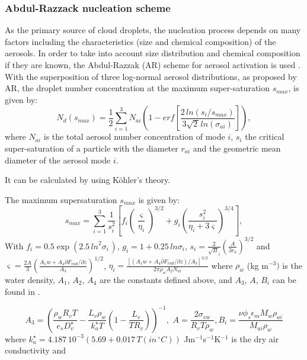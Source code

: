 \subsubsection{Abdul-Razzack nucleation scheme}

As the primary source of cloud droplets, the nucleation process depends on
many factors including the characteristics (size and chemical composition)
of the aerosols. In order to take into account size distribution and
chemical composition if they are known, the Abdul-Razzak (AR) scheme
for aerosol activation is used \cite{Abdul-Razzak:2000}. With the superposition of three
log-normal aerosol distributions, as proposed by AR, the droplet number
concentration at the maximum super-saturation $s_{max}$, is given by:
\begin{equation}
N_{d}\left( s_{max} \right)=\frac{1}{2}\sum\limits_{i=1}^3 {N_{ai}\left(
1-erf\left[ \frac{2\, ln\left( s_{i}/s_{max} \right)}{3\sqrt {2\, } ln\left(
\sigma_{ai} \right)} \right] \right)} ,
\end{equation}
where $N_{ai} $ is the total aerosol number concentration of mode $i$,
$s_{i}$ the critical super-saturation of a particle with the diameter $r_{ai}$ and
the geometric mean diameter of the aerosol mode $i$.

It can be calculated by using K\"{o}hler's theory.

The maximum supersaturation $s_{max} $ is given by:
\begin{equation}
s_{max}=\sum\limits_{i=1}^3 \frac{1}{s_{i}^{2}} \left[ f_{i}\left(
\frac{\varsigma }{\eta_{i}} \right)^{3/2}+g_{i}\left( \frac{s_{i}^{2}}{\eta
_{i}+3\varsigma } \right)^{3/4} \right],
\end{equation}
With $f_{i}=0.5\exp \left( 2.5\, {ln}^{2}\sigma_{i\, } \right),\, g_{i}=1+0.25\, ln\sigma_{i}$,
$s_{i}=\frac{2}{\sqrt B_{i} }\left(\frac{A}{3r_{a}} \right)^{3/2}$
\newline
and $\varsigma =\frac{2A}{3}\left( \frac{A_{1}w+A_{4}\partial
F_{rad}/\partial z}{A_{3}} \right)^{1/2}$, $\eta_{i}=\frac{\left[ \left(
A_{1}w+A_{4}\partial F_{rad}/\partial z \right)/A_{3} \right]^{3/2}}{2\pi
\rho_{w}A_{2}N_{ai}}$
\newline
where $\rho_{w}$ (kg m$^{-3})$ is the water density, $A_{1}$, $A_{2}$,
$A_{4}$ are the constants defined above,
and $A_{3}$, $A$, $B_{i}$ can be found in
 \cite{Abdul-Razzak:2000}.

\begin{equation}
A_{3}=\left( \frac{\rho_{w}R_{v}T}{e_{s}D_{v}^{\star }}-\frac{L_{v}\rho
_{w}}{k_{a}^{\star }T}\left( 1-\frac{L_{v}}{TR_{v}} \right) \right)^{-1},\,
\, A=\frac{2\sigma_{vw}}{R_{v}T\rho_{w}},
B_{i}=\frac{\nu \phi_{s}\epsilon_{m}M_{w}\rho_{ai}}{M_{ai}\rho_{w}}
\end{equation}
where $k_{a}^{\star }=4.187\, {10}^{-3}\left( 5.69+0.017\, T\left( in\,
^{\circ}C \right) \right)$ Jm$^{-1}$s$^{-1}$K$^{-1}$ is the dry air
conductivity and

